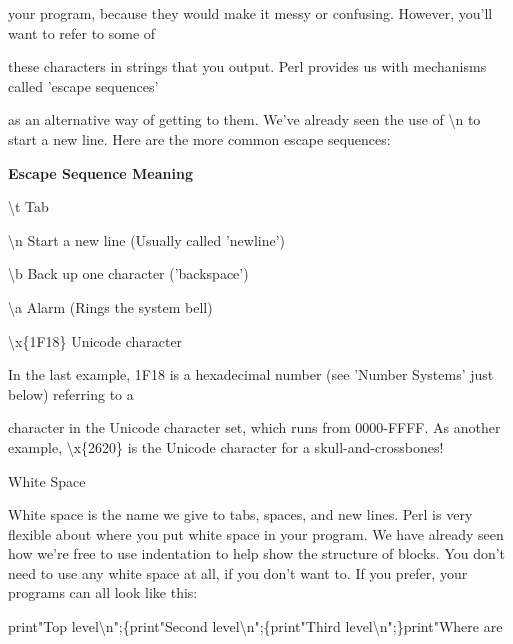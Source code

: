 \documentclass[a4paper,11pt]{book}
\begin{document}
\noindent your program, because they would make it messy or confusing. However, you'll want to refer to some of

\noindent these characters in strings that you output. Perl provides us with mechanisms called 'escape sequences'

\noindent as an alternative way of getting to them. We've already seen the use of \textbackslash n to start a new line. Here are the more common escape sequences:

\noindent 

\noindent 

\noindent \textbf{Escape Sequence Meaning}

\noindent 

\noindent \textbackslash t Tab

\noindent 

\noindent \textbackslash n Start a new line (Usually called 'newline')

\noindent 

\noindent \textbackslash b Back up one character ('backspace')

\noindent 

\noindent \textbackslash a Alarm (Rings the system bell)

\noindent 

\noindent \textbackslash x\{1F18\} Unicode character

\noindent 

\noindent 

\noindent In the last example, 1F18 is a hexadecimal number (see 'Number Systems' just below) referring to a

\noindent character in the Unicode character set, which runs from 0000-FFFF. As another example, \textbackslash x\{2620\} is the Unicode character for a skull-and-crossbones!

\noindent 

\noindent White Space

\noindent 

\noindent White space is the name we give to tabs, spaces, and new lines. Perl is very flexible about where you put white space in your program. We have already seen how we're free to use indentation to help show the structure of blocks. You don't need to use any white space at all, if you don't want to. If you prefer, your programs can all look like this:

\noindent 

\noindent 

\noindent print"Top level\textbackslash n";\{print"Second level\textbackslash n";\{print"Third level\textbackslash n";\}print"Where are
\end{document}

